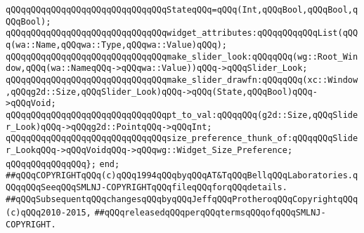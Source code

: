 \newline
\verb|qQQqqQQqqQQqqQQqqQQqqQQqqQQqqQQqStateqQQq=qQQq(Int,qQQqBool,qQQqBool,qQQqBool);|\newline
\newline
\verb|qQQqqQQqqQQqqQQqqQQqqQQqqQQqqQQqwidget_attributes:qQQqqQQqqQQqList(qQQq(wa::Name,qQQqwa::Type,qQQqwa::Value)qQQq);|\newline
\newline
\verb|qQQqqQQqqQQqqQQqqQQqqQQqqQQqqQQqmake_slider_look:qQQqqQQq(wg::Root_Window,qQQq(wa::NameqQQq->qQQqwa::Value))qQQq->qQQqSlider_Look;|\newline
\newline
\verb|qQQqqQQqqQQqqQQqqQQqqQQqqQQqqQQqmake_slider_drawfn:qQQqqQQq(xc::Window,qQQqg2d::Size,qQQqSlider_Look)qQQq->qQQq(State,qQQqBool)qQQq->qQQqVoid;|\newline
\newline
\verb|qQQqqQQqqQQqqQQqqQQqqQQqqQQqqQQqpt_to_val:qQQqqQQq(g2d::Size,qQQqSlider_Look)qQQq->qQQqg2d::PointqQQq->qQQqInt;|\newline
\newline
\verb|qQQqqQQqqQQqqQQqqQQqqQQqqQQqqQQqsize_preference_thunk_of:qQQqqQQqSlider_LookqQQq->qQQqVoidqQQq->qQQqwg::Widget_Size_Preference;|\newline
\verb|qQQqqQQqqQQqqQQq};|\newline
\verb|end;|\newline
\newline
\newline
\verb|##qQQqCOPYRIGHTqQQq(c)qQQq1994qQQqbyqQQqAT&TqQQqBellqQQqLaboratories.qQQqqQQqSeeqQQqSMLNJ-COPYRIGHTqQQqfileqQQqforqQQqdetails.|\newline
\verb|##qQQqSubsequentqQQqchangesqQQqbyqQQqJeffqQQqProtheroqQQqCopyrightqQQq(c)qQQq2010-2015,|\newline
\verb|##qQQqreleasedqQQqperqQQqtermsqQQqofqQQqSMLNJ-COPYRIGHT.|\newline

